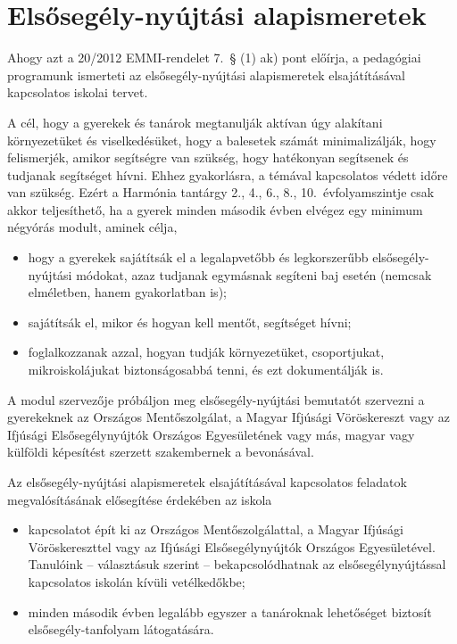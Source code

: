 \section{Elsősegély-nyújtási alapismeretek}
\label{sec:elsosegely}
Ahogy azt a 20/2012 EMMI-rendelet 7.~§ (1) ak) pont előírja, a pedagógiai programunk ismerteti az elsősegély-nyújtási alapismeretek elsajátításával kapcsolatos iskolai tervet.

A cél, hogy a gyerekek és tanárok megtanulják aktívan úgy alakítani környezetüket és viselkedésüket, hogy a balesetek számát minimalizálják, hogy felismerjék, amikor segítségre van szükség, hogy hatékonyan segítsenek és tudjanak segítséget hívni. Ehhez gyakorlásra, a témával kapcsolatos védett időre van szükség. Ezért a Harmónia tantárgy 2., 4., 6., 8., 10.~évfolyamszintje csak akkor teljesíthető, ha a gyerek minden második évben elvégez egy minimum négyórás modult, aminek célja,
\begin{itemize}
    \item hogy a gyerekek sajátítsák el a legalapvetőbb és legkorszerűbb elsőse\-gély-nyújtási módokat, azaz tudjanak egymásnak segíteni baj esetén (nemcsak elméletben, hanem gyakorlatban is);
    \item sajátítsák el, mikor és hogyan kell mentőt, segítséget hívni;
    \item foglalkozzanak azzal, hogyan tudják környezetüket, csoportjukat, mikroiskolájukat biztonságosabbá tenni, és ezt dokumentálják is.
\end{itemize}

A modul szervezője próbáljon meg elsősegély-nyújtási bemutatót szervezni a gyerekeknek az Országos Mentőszolgálat, a Magyar Ifjúsági Vöröskereszt vagy az Ifjúsági Elsősegélynyújtók Országos Egyesületének vagy más, magyar vagy külföldi képesítést szerzett szakembernek a bevonásával.

Az elsősegély-nyújtási alapismeretek elsajátításával kapcsolatos feladatok megvalósításának elősegítése érdekében az iskola
\begin{itemize}
    \item kapcsolatot épít ki az Országos Mentőszolgálattal, a Magyar Ifjúsági Vöröskereszttel vagy az Ifjúsági Elsősegélynyújtók Országos Egyesületével. Tanulóink -- választásuk szerint -- bekapcsolódhatnak az elsősegélynyújtással kapcsolatos iskolán kívüli vetélkedőkbe;
    \item  minden második évben legalább egyszer a tanároknak lehetőséget biztosít elsősegély-tanfolyam látogatására.

\end{itemize}
